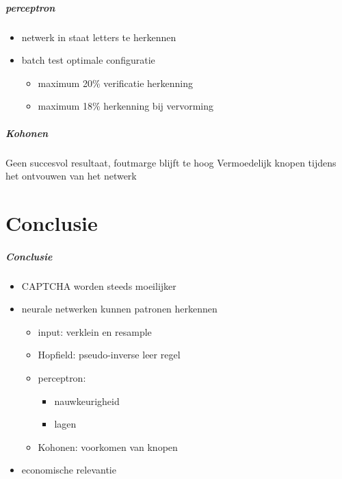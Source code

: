 \documentclass{beamer}
\begin{document}
\begin{frame}
  \frametitle{perceptron}
  \transfade
    \begin{itemize}
      \item netwerk in staat letters te herkennen
      \item batch test optimale configuratie
        \begin{itemize}
          \item maximum 20\% verificatie herkenning
          \item maximum 18\% herkenning bij vervorming
        \end{itemize}
    \end{itemize}
    \vfill
\end{frame}
\begin{frame}
  \frametitle{Kohonen}
  \transfade
  Geen succesvol resultaat, foutmarge blijft te hoog
  \vfill
  Vermoedelijk knopen tijdens het ontvouwen van het netwerk
\end{frame}
\part{Conclusie}
\begin{frame}
  \frametitle{Conclusie}
  \transfade
  \begin{itemize}
    \item<+-> CAPTCHA worden steeds moeilijker
    \item<+-> neurale netwerken kunnen patronen herkennen
      \begin{itemize}
        \item<+-> input: verklein en resample
        \item<+-> Hopfield: pseudo-inverse leer regel
        \item<+-> perceptron:
          \begin{itemize}
            \item nauwkeurigheid
            \item lagen
          \end{itemize}
        \item<+-> Kohonen: voorkomen van knopen 
      \end{itemize}
    \item<+-> economische relevantie
  \end{itemize}
\end{frame}
\end{document}
